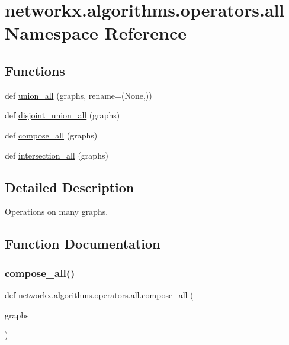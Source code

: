 \hypertarget{namespacenetworkx_1_1algorithms_1_1operators_1_1all}{}\section{networkx.\+algorithms.\+operators.\+all Namespace Reference}
\label{namespacenetworkx_1_1algorithms_1_1operators_1_1all}
\subsection*{Functions}
\begin{DoxyCompactItemize}
\item 
def \hyperlink{namespacenetworkx_1_1algorithms_1_1operators_1_1all_aa0df7e5fc8bf2bd495bce365727ccde7}{union\+\_\+all} (graphs, rename=(None,))
\item 
def \hyperlink{namespacenetworkx_1_1algorithms_1_1operators_1_1all_a14b22d0f0f0cfb34074e57c5e71ca175}{disjoint\+\_\+union\+\_\+all} (graphs)
\item 
def \hyperlink{namespacenetworkx_1_1algorithms_1_1operators_1_1all_a90558d7b299f112034ae3457f4b9a093}{compose\+\_\+all} (graphs)
\item 
def \hyperlink{namespacenetworkx_1_1algorithms_1_1operators_1_1all_ace8d3d7c3693100c65c1645c3da72b72}{intersection\+\_\+all} (graphs)
\end{DoxyCompactItemize}


\subsection{Detailed Description}
\begin{DoxyVerb}Operations on many graphs.
\end{DoxyVerb}
 

\subsection{Function Documentation}
\mbox{\label{namespacenetworkx_1_1algorithms_1_1operators_1_1all_a90558d7b299f112034ae3457f4b9a093}} 
\subsubsection{\texorpdfstring{compose\+\_\+all()}{compose\_all()}}
{\footnotesize\ttfamily def networkx.\+algorithms.\+operators.\+all.\+compose\+\_\+all (\begin{DoxyParamCaption}\item[{}]{graphs }\end{DoxyParamCaption})}


